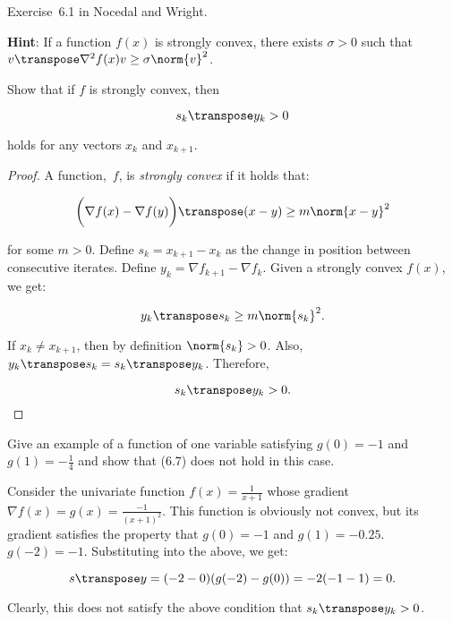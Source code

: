 \begin{problem}\label{prob:01}%
  Exercise~6.1 in Nocedal and Wright.



  \textbf{Hint}: \textnormal{If a function $f(x)$ is strongly convex, there exists $\sigma > 0$ such that $v\transpose \nabla^{2}f(x) v \geq \sigma \norm{v}^2$.}
\end{problem}

\begin{subproblem}
  Show that if $f$ is strongly convex, then

  \[ s_{k}\transpose y_k > 0 \]

  \vspace{-1em}
  holds for any vectors $x_k$ and $x_{k+1}$.
\end{subproblem}

\begin{proof}
  A function,~$f$, is \textit{strongly convex} if it holds that:

  \[\bigg(\nabla f(x) - \nabla f(y)\bigg)\transpose (x-y) \geq m \norm{x-y}^2 \]

  \noindent
  for some $m>0$.  Define $s_k=x_{k+1}-x_k$ as the change in position between consecutive iterates.  Define $y_k = \nabla f_{k+1} - \nabla f_k$. Given a strongly convex $f(x)$, we get:

  \[y_k\transpose s_k \geq m \norm{s_k}^2 \text{.}\]

  \noindent
  If $x_k \neq x_{k+1}$, then by definition $\norm{s_k}>0$. Also, $y_k\transpose s_k = s_k\transpose y_k$.  Therefore,

  \[s_k\transpose y_k >0 \text{.} \]
\end{proof}

\begin{subproblem}
  Give an example of a function of one variable satisfying $g(0)=-1$ and $g(1)=-\frac{1}{4}$ and show that (6.7) does not hold in this case.
\end{subproblem}

Consider the univariate function $f(x) =\frac{1}{x+1}$ whose gradient $\nabla f(x) = g(x)= \frac{-1}{(x+1)^2}$.  This function is obviously not convex, but its gradient satisfies the property that $g(0)=-1$ and $g(1) = -0.25$.  $g(-2) = -1$.  Substituting into the above, we get:

\[s\transpose y = (-2 - 0)(g(-2) - g(0)) = -2 (-1 - 1) = 0 \text{.} \]

\noindent
Clearly, this does not satisfy the above condition that $s_k\transpose y_k >0$.



